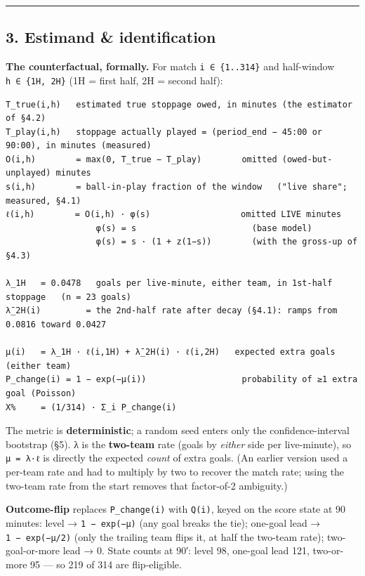 \documentclass[
]{article}
\begin{document}
\begin{center}\rule{0.5\linewidth}{0.5pt}\end{center}

\subsection{3. Estimand \&
identification}\label{estimand-identification}

\textbf{The counterfactual, formally.} For match
\texttt{i\ ∈\ \{1..314\}} and half-window \texttt{h\ ∈\ \{1H,\ 2H\}} (1H
= first half, 2H = second half):

\begin{verbatim}
T_true(i,h)   estimated true stoppage owed, in minutes (the estimator of §4.2)
T_play(i,h)   stoppage actually played = (period_end − 45:00 or 90:00), in minutes (measured)
O(i,h)        = max(0, T_true − T_play)        omitted (owed-but-unplayed) minutes
s(i,h)        = ball-in-play fraction of the window   ("live share"; measured, §4.1)
ℓ(i,h)        = O(i,h) · φ(s)                  omitted LIVE minutes
                  φ(s) = s                       (base model)
                  φ(s) = s · (1 + z(1−s))        (with the gross-up of §4.3)

λ_1H   = 0.0478   goals per live-minute, either team, in 1st-half stoppage   (n = 23 goals)
λ̄_2H(i)         = the 2nd-half rate after decay (§4.1): ramps from 0.0816 toward 0.0427

μ(i)   = λ_1H · ℓ(i,1H) + λ̄_2H(i) · ℓ(i,2H)   expected extra goals (either team)
P_change(i) = 1 − exp(−μ(i))                   probability of ≥1 extra goal (Poisson)
X%     = (1/314) · Σ_i P_change(i)
\end{verbatim}

The metric is \textbf{deterministic}; a random seed enters only the
confidence-interval bootstrap (§5). λ is the \textbf{two-team} rate
(goals by \emph{either} side per live-minute), so \texttt{μ\ =\ λ·ℓ} is
directly the expected \emph{count} of extra goals. (An earlier version
used a per-team rate and had to multiply by two to recover the match
rate; using the two-team rate from the start removes that factor-of-2
ambiguity.)

\textbf{Outcome-flip} replaces \texttt{P\_change(i)} with \texttt{Q(i)},
keyed on the score state at 90 minutes: level → \texttt{1\ −\ exp(−μ)}
(any goal breaks the tie); one-goal lead → \texttt{1\ −\ exp(−μ/2)}
(only the trailing team flips it, at half the two-team rate);
two-goal-or-more lead → 0. State counts at 90′: level 98, one-goal lead
121, two-or-more 95 --- so 219 of 314 are flip-eligible.
\end{document}
